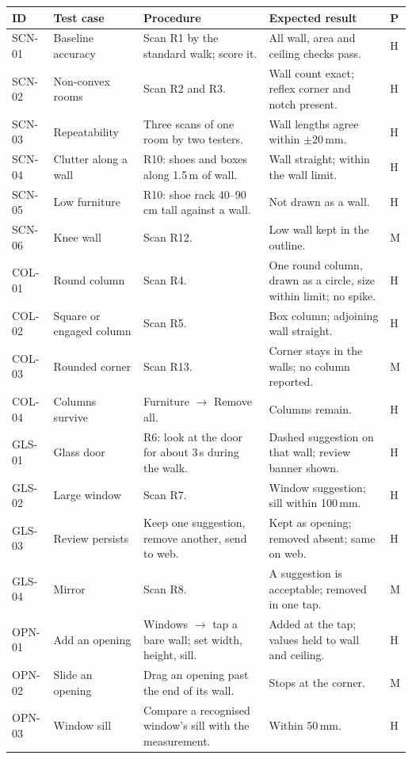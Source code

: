\documentclass[conference,a4paper,10pt]{IEEEtran}
\begin{document}
\begin{longtable}{@{}L{1.25cm}L{3.6cm}L{5.4cm}L{5.1cm}C{0.4cm}@{}}
\toprule
ID & Test case & Procedure & Expected result & P \\
\midrule
\endhead
\bottomrule
\endfoot
SCN-01 & Baseline accuracy & Scan R1 by the standard walk; score it. & All wall, area and ceiling checks pass. & H \\
SCN-02 & Non-convex rooms & Scan R2 and R3. & Wall count exact; reflex corner and notch present. & H \\
SCN-03 & Repeatability & Three scans of one room by two testers. & Wall lengths agree within $\pm$20\,mm. & H \\
SCN-04 & Clutter along a wall & R10: shoes and boxes along 1.5\,m of wall. & Wall straight; within the wall limit. & H \\
SCN-05 & Low furniture & R10: shoe rack 40--90\,cm tall against a wall. & Not drawn as a wall. & H \\
SCN-06 & Knee wall & Scan R12. & Low wall kept in the outline. & M \\
COL-01 & Round column & Scan R4. & One round column, drawn as a circle, size within limit; no spike. & H \\
COL-02 & Square or engaged column & Scan R5. & Box column; adjoining wall straight. & H \\
COL-03 & Rounded corner & Scan R13. & Corner stays in the walls; no column reported. & M \\
COL-04 & Columns survive & Furniture $\rightarrow$ Remove all. & Columns remain. & H \\
GLS-01 & Glass door & R6: look at the door for about 3\,s during the walk. & Dashed suggestion on that wall; review banner shown. & H \\
GLS-02 & Large window & Scan R7. & Window suggestion; sill within 100\,mm. & H \\
GLS-03 & Review persists & Keep one suggestion, remove another, send to web. & Kept as opening; removed absent; same on web. & H \\
GLS-04 & Mirror & Scan R8. & A suggestion is acceptable; removed in one tap. & M \\
OPN-01 & Add an opening & Windows $\rightarrow$ tap a bare wall; set width, height, sill. & Added at the tap; values held to wall and ceiling. & H \\
OPN-02 & Slide an opening & Drag an opening past the end of its wall. & Stops at the corner. & M \\
OPN-03 & Window sill & Compare a recognised window's sill with the measurement. & Within 50\,mm. & H \\

\end{longtable}
\end{document}
